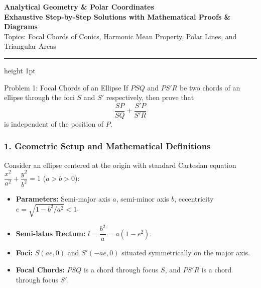 \documentclass[11pt,a4paper]{article}
\begin{document}
\begin{center}
    {\LARGE\bfseries\color{primaryblue} Analytical Geometry \& Polar Coordinates}\\[1.5mm]
    {\large\color{secondaryblue}\textbf{Exhaustive Step-by-Step Solutions with Mathematical Proofs \& Diagrams}}\\[1.2mm]
    {\small\color{darkgray} Topics: Focal Chords of Conics, Harmonic Mean Property, Polar Lines, and Triangular Areas}
    \vspace{1.5mm}
    \hrule height 1pt
    \vspace{2mm}
\end{center}

\noindent
\begin{problembox}{Problem 1: Focal Chords of an Ellipse}
If $PSQ$ and $PS'R$ be two chords of an ellipse through the foci $S$ and $S'$ respectively, then prove that
\[
\frac{SP}{SQ} + \frac{S'P}{S'R}
\]
is independent of the position of $P$.
\end{problembox}

\subsubsection*{1. Geometric Setup and Mathematical Definitions}
Consider an ellipse centered at the origin with standard Cartesian equation $\dfrac{x^2}{a^2} + \dfrac{y^2}{b^2} = 1$ ($a > b > 0$):
\begin{itemize}\setlength{\itemsep}{1pt}
    \item \textbf{Parameters:} Semi-major axis $a$, semi-minor axis $b$, eccentricity $e = \sqrt{1 - b^2/a^2} < 1$.
    \item \textbf{Semi-latus Rectum:} $l = \dfrac{b^2}{a} = a(1 - e^2)$.
    \item \textbf{Foci:} $S(ae, 0)$ and $S'(-ae, 0)$ situated symmetrically on the major axis.
    \item \textbf{Focal Chords:} $PSQ$ is a chord through focus $S$, and $PS'R$ is a chord through focus $S'$.
\end{itemize}
\end{document}
